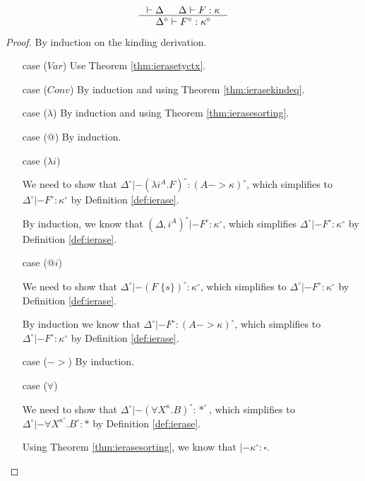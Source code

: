 \begin{theorem}
\label{thm:ierasekinding}
\[ \inference{|- \Delta & \Delta |- F : \kappa}
		{\Delta^\circ |- F^\circ : \kappa^\circ}
\]
\end{theorem}
\begin{proof}
	By induction on the kinding derivation.
\begin{itemize}
\item[case] ($Var$)
	Use Theorem \ref{thm:ierasetyctx}.

\item[case] ($Conv$)
	By induction and using Theorem \ref{thm:ierasekindeq}.

\item[case] ($\lambda$)
	By induction and using Theorem \ref{thm:ierasesorting}.

\item[case] ($@$)
	By induction.

\item[case] ($\lambda i$)

	We need to show that
	$\Delta^\circ |- (\lambda i^A.F)^\circ : (A -> \kappa)^\circ$,
	which simplifies to $\Delta^\circ |- F^\circ : \kappa^\circ$
	by Definition \ref{def:ierase}.

	By induction, we know that
	$(\Delta,i^A)^\circ |- F^\circ : \kappa^\circ $,
	which simplifies $\Delta^\circ |- F^\circ : \kappa^\circ$
	by Definition \ref{def:ierase}.

\item[case] ($@ i$)

	We need to show that
	$\Delta^\circ |- (F\;\{s\})^\circ : \kappa^\circ$,
	which simplifies to $\Delta^\circ |- F^\circ : \kappa^\circ$
	by Definition \ref{def:ierase}.

	By induction we know that
	$\Delta^\circ |- F^\circ : (A -> \kappa)^\circ$,
	which simplifies to $\Delta^\circ |- F^\circ : \kappa^\circ$
	by Definition \ref{def:ierase}.

\item[case] ($->$)
	By induction.

\item[case] ($\forall$)

	We need to show that
	$\Delta^\circ |- (\forall X^\kappa.B)^\circ : *^\circ$,
	which simplifies to
	$\Delta^\circ |- \forall X^{\kappa^\circ}.B^\circ : *$
	by Definition \ref{def:ierase}.

	Using Theorem \ref{thm:ierasesorting}, we know that
	$|- \kappa^\circ : \square$.


\end{itemize}
\end{proof}
